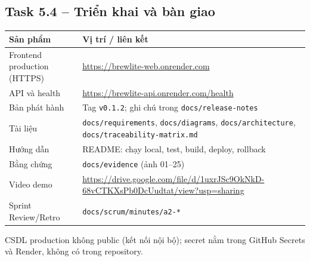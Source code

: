 \documentclass[a4paper]{article}
\begin{document}
\subsection{Task 5.4 -- Triển khai và bàn giao}
\begin{center}
\small\everymath{}
\begin{tabular}{@{}p{3.8cm}p{9.8cm}@{}}
\toprule \textbf{Sản phẩm} & \textbf{Vị trí / liên kết} \\ \midrule
Frontend production (HTTPS) & \url{https://brewlite-web.onrender.com} \\
API và health & \url{https://brewlite-api.onrender.com/health} \\
Bản phát hành & Tag \texttt{v0.1.2}; ghi chú trong \texttt{docs/release-notes} \\
Tài liệu & \texttt{docs/requirements}, \texttt{docs/diagrams}, \texttt{docs/architecture}, \texttt{docs/traceability-matrix.md} \\
Hướng dẫn & README: chạy local, test, build, deploy, rollback \\
Bằng chứng & \texttt{docs/evidence} (ảnh 01--25) \\
Video demo & \url{https://drive.google.com/file/d/1uxrJSc9OkNkD-68vCTKXsPb0DcUudtat/view?usp=sharing} \\
Sprint Review/Retro & \texttt{docs/scrum/minutes/a2-*} \\
\bottomrule
\end{tabular}
\end{center}
CSDL production không public (kết nối nội bộ); secret nằm trong GitHub Secrets và Render, không có trong repository.

\end{document}
